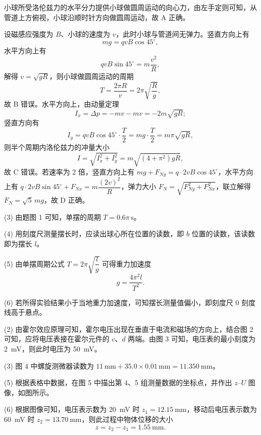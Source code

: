 \begin{answer}
小球所受洛伦兹力的水平分力提供小球做圆周运动的向心力，由左手定则可知，从管道上方俯视，小球沿顺时针方向做圆周运动，故 A 正确。

设磁感应强度为 $B$、小球的速度为 $v$，此时小球与管道间无弹力。竖直方向上有
\[
  mg=qvB\cos45^{\circ},
\]
水平方向上有
\[
  qvB\sin45^{\circ}=m\frac{v^{2}}{R},
\]
解得 $v=\sqrt{gR}$，则小球做圆周运动的周期
\[
  T=\frac{2\pi R}{v}=2\pi\sqrt{\frac{R}{g}},
\]
故 B 错误。水平方向上，由动量定理
\[
  I_{x}=\Delta p=-mv-mv=-2m\sqrt{gR};
\]
竖直方向有
\[
  I_{y}=qvB\cos45^{\circ}\cdot\frac{T}{2}=mg\cdot\frac{T}{2}=m\pi\sqrt{gR},
\]
则半个周期内洛伦兹力的冲量大小
\[
  I=\sqrt{I_{x}^{2}+I_{y}^{2}}=m\sqrt{(4+\pi^{2})gR},
\]
故 C 错误。若速率为 2 倍，竖直方向上有 $mg+F_{Ny}=q\cdot 2vB\cos45^{\circ}$，水平方向上有 $q\cdot 2vB\sin45^{\circ}+F_{Nx}=m\dfrac{(2v)^{2}}{R}$，弹力大小 $F_{N}=\sqrt{F_{Ny}^{2}+F_{Nx}^{2}}$，联立解得 $F_{N}=\sqrt{5}\,mg$，故 D 正确。
\end{answer}

\begin{answer}
(3) 由题图 1 可知，单摆的周期 $T=0.6\pi\,\si{\second}$。

(4) 用刻度尺测量摆长时，应读出球心所在位置的读数，即 $b$ 位置的读数，该读数即为摆长 $l$。

(5) 由单摆周期公式 $T=2\pi\sqrt{\dfrac{l}{g}}$ 可得重力加速度
\[
  g=\frac{4\pi^{2}l}{T^{2}}.
\]

(6) 若所得实验结果小于当地重力加速度，可知摆长测量值偏小，即刻度尺 0 刻度线高于悬点。
\end{answer}

\begin{answer}
(2) 由霍尔效应原理可知，霍尔电压出现在垂直于电流和磁场的方向上，结合图 2 可知，应将电压表接在霍尔元件的 $c$、$d$ 两端。由图 3 可知，电压表的最小刻度为 \SI{2}{\milli\volt}，则此时电压为 \SI{50}{\milli\volt}。

(3) 图 4 中螺旋测微器读数为 $11\,\si{\milli\metre}+35.0\times0.01\,\si{\milli\metre}=\SI{11.350}{\milli\metre}$。

(5) 根据表格中数据，在图 5 中描出第 4、5 组测量数据的坐标点，并作出 $z$--$U$ 图像，如图所示。


(6) 根据图像可知，电压表示数为 \SI{20}{\milli\volt} 时 $z_{1}=\SI{12.15}{\milli\metre}$，移动后电压表示数为 \SI{60}{\milli\volt} 时 $z_{2}=\SI{13.70}{\milli\metre}$，则此过程中物体位移的大小
\[
  z=z_{2}-z_{1}=\SI{1.55}{\milli\metre}.
\]
\end{answer}

